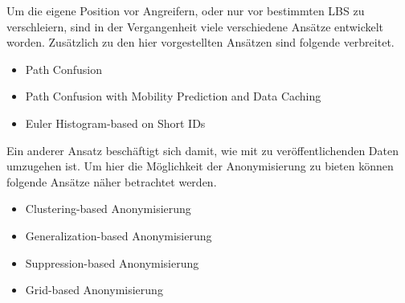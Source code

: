 Um die eigene Position vor Angreifern, oder nur vor bestimmten LBS zu verschleiern, sind in der Vergangenheit viele verschiedene Ansätze entwickelt worden. Zusätzlich zu den hier vorgestellten Ansätzen sind folgende verbreitet.
\begin{itemize}
\item{Path Confusion}
\item{Path Confusion with Mobility Prediction and Data Caching}
\item{Euler Histogram-based on Short IDs}
\end{itemize}
Ein anderer Ansatz beschäftigt sich damit, wie mit zu veröffentlichenden Daten umzugehen ist. Um hier die Möglichkeit der Anonymisierung zu bieten können folgende Ansätze näher betrachtet werden.
\begin{itemize}
\item {Clustering-based Anonymisierung}
\item{Generalization-based Anonymisierung}
\item{Suppression-based Anonymisierung}
\item{Grid-based Anonymisierung}
\end{itemize}